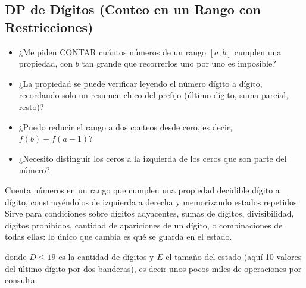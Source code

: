 \subsection{DP de Dígitos (Conteo en un Rango con Restricciones)}
\label{alg:6-7}


\begin{itemize}
\item ¿Me piden CONTAR cuántos números de un rango $[a, b]$ cumplen una propiedad, con $b$ tan grande que recorrerlos uno por uno es imposible?
\item ¿La propiedad se puede verificar leyendo el número dígito a dígito, recordando solo un resumen chico del prefijo (último dígito, suma parcial, resto)?
\item ¿Puedo reducir el rango a dos conteos desde cero, es decir, $f(b) - f(a-1)$?
\item ¿Necesito distinguir los ceros a la izquierda de los ceros que son parte del número?
\end{itemize}

 Cuenta números en un rango que cumplen una propiedad decidible dígito a dígito, construyéndolos de izquierda a derecha y memorizando estados repetidos. Sirve para condiciones sobre dígitos adyacentes, sumas de dígitos, divisibilidad, dígitos prohibidos, cantidad de apariciones de un dígito, o combinaciones de todas ellas: lo único que cambia es qué se guarda en el estado.

  donde $D \le 19$ es la cantidad de dígitos y $E$ el tamaño del estado (aquí 10 valores del último dígito por dos banderas), es decir unos pocos miles de operaciones por consulta.

